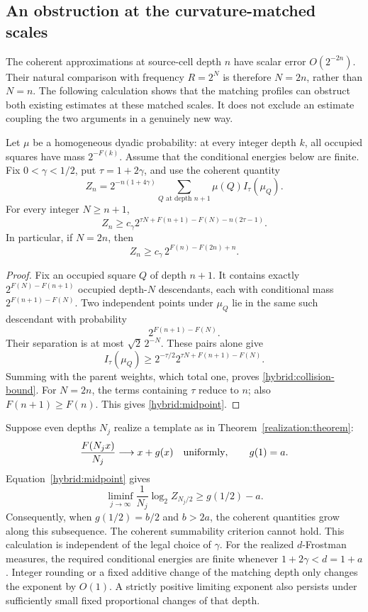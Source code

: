 \subsection{An obstruction at the curvature-matched scales}
\label{hybrid:subsection}

The coherent approximations at source-cell depth \(n\) have scalar error
\(O(2^{-2n})\). Their natural comparison with frequency \(R=2^N\) is
therefore \(N=2n\), rather than \(N=n\). The following calculation shows
that the matching profiles can obstruct both existing estimates at these
matched scales. It does not exclude an estimate coupling the two arguments
in a genuinely new way.

\begin{lemma}\label{hybrid:collision}
Let \(\mu\) be a homogeneous dyadic probability: at every integer depth
\(k\), all occupied squares have mass \(2^{-F(k)}\). Assume that the
conditional energies below are finite. Fix \(0<\gamma<1/2\), put
\(\tau=1+2\gamma\), and use the coherent quantity
\[
 Z_n=2^{-n(1+4\gamma)}
 \sum_{Q\text{ at depth }n+1}\mu(Q)I_\tau(\mu_Q).
\]
For every integer \(N\ge n+1\),
\begin{equation}\label{hybrid:collision-bound}
 Z_n\ge c_\gamma
 2^{\tau N+F(n+1)-F(N)-n(2\tau-1)}.
\end{equation}
In particular, if \(N=2n\), then
\begin{equation}\label{hybrid:midpoint}
 Z_n\ge c_\gamma\,2^{F(n)-F(2n)+n}.
\end{equation}
\end{lemma}
\begin{proof}
Fix an occupied square \(Q\) of depth \(n+1\). It contains exactly
\(2^{F(N)-F(n+1)}\) occupied depth-\(N\) descendants, each with
conditional mass \(2^{F(n+1)-F(N)}\). Two independent points under
\(\mu_Q\) lie in the same such descendant with probability
\[
 2^{F(n+1)-F(N)}.
\]
Their separation is at most \(\sqrt2\,2^{-N}\). These pairs alone
give
\[
 I_\tau(\mu_Q)\ge
 2^{-\tau/2}2^{\tau N+F(n+1)-F(N)}.
\]
Summing with the parent weights, which total one, proves
\eqref{hybrid:collision-bound}. For \(N=2n\), the terms containing
\(\tau\) reduce to \(n\); also \(F(n+1)\ge F(n)\).
This gives \eqref{hybrid:midpoint}.
\end{proof}

Suppose even depths \(N_j\) realize a template as in
Theorem~\ref{realization:theorem}:
\[
 \frac{F(N_jx)}{N_j}\longrightarrow x+g(x)
 \quad\hbox{uniformly},\qquad g(1)=a.
\]
Equation~\eqref{hybrid:midpoint} gives
\begin{equation}\label{hybrid:exponent}
 \liminf_{j\to\infty}\frac1{N_j}\log_2 Z_{N_j/2}
 \ge g(1/2)-a.
\end{equation}
Consequently, when \(g(1/2)=b/2\) and \(b>2a\), the coherent
quantities grow along this subsequence. The coherent summability
criterion cannot hold. This calculation is independent of the legal
choice of \(\gamma\). For the realized \(d\)-Frostman measures,
the required conditional energies are finite whenever
\(1+2\gamma<d=1+a\).
Integer rounding or a fixed additive change of the matching depth only
changes the exponent by \(O(1)\). A strictly positive limiting exponent
also persists under sufficiently small fixed proportional changes of
that depth.

